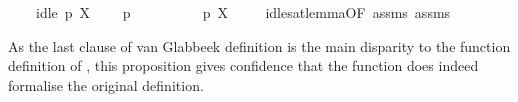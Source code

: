 \begin{isabellebody}
\ \ \ \ {\isacartoucheopen}idle\ p\ X{\isacartoucheclose}\isanewline
\ \ \ \ {\isacartoucheopen}p\ {\isasymTTurnstile}\ {\isasymphi}{\isacartoucheclose}\isanewline
\ \ \ \isanewline
\ \ \ \ {\isacartoucheopen}p\ {\isasymTTurnstile}{\isacharbrackleft}{\kern0pt}X{\isacharbrackright}{\kern0pt}\ {\isasymphi}{\isacartoucheclose}\isanewline
%
\isadelimproof
\ \ %
\endisadelimproof
%
\isatagproof
{}\isamarkupfalse%
\ idle{\isacharunderscore}{\kern0pt}sat{\isacharunderscore}{\kern0pt}lemma{\isacharbrackleft}{\kern0pt}OF\ assms{\isacharparenleft}{\kern0pt}{}{\isacharcomma}{\kern0pt}{}{\isacharparenright}{\kern0pt}{\isacharbrackright}{\kern0pt}\ assms{\isacharparenleft}{\kern0pt}{}{\isacharparenright}{\kern0pt}\ \isacommand{{\isachardot}{\kern0pt}{\isachardot}{\kern0pt}}\isamarkupfalse%
%
\endisatagproof
{\isafoldproof}%
%
\isadelimproof
%
\endisadelimproof
%
\begin{isamarkuptext}%
As the last clause of van Glabbeek definition is the main disparity to the function definition of , this proposition gives confidence that the function does indeed formalise the original definition.%
\end{isamarkuptext}\isamarkuptrue%
\isamarkupfalse%
\ %
%
\isadelimtheory
%
\endisadelimtheory
%
\isatagtheory
%
\endisatagtheory
{\isafoldtheory}%
%
\isadelimtheory
%
\endisadelimtheory
%
\end{isabellebody}%
\endinput
